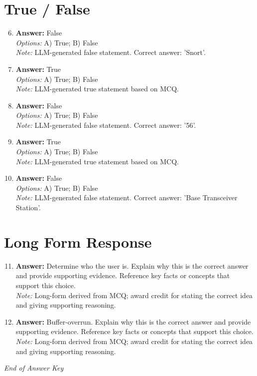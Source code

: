 \documentclass[12pt]{article}
\begin{document}
\section*{True / False}
\begin{enumerate}[label=\arabic*.]
\setcounter{enumi}{5}
\item \textbf{Answer:} False
\\ \textit{Options:} A) True; B) False
\\ \textit{Note:} LLM-generated false statement. Correct answer: 'Snort'.
\item \textbf{Answer:} True
\\ \textit{Options:} A) True; B) False
\\ \textit{Note:} LLM-generated true statement based on MCQ.
\item \textbf{Answer:} False
\\ \textit{Options:} A) True; B) False
\\ \textit{Note:} LLM-generated false statement. Correct answer: '56'.
\item \textbf{Answer:} True
\\ \textit{Options:} A) True; B) False
\\ \textit{Note:} LLM-generated true statement based on MCQ.
\item \textbf{Answer:} False
\\ \textit{Options:} A) True; B) False
\\ \textit{Note:} LLM-generated false statement. Correct answer: 'Base Transceiver Station'.
\end{enumerate}

\section*{Long Form Response}
\begin{enumerate}[label=\arabic*.]
\setcounter{enumi}{10}
\item \textbf{Answer:} Determine who the user is. Explain why this is the correct answer and provide supporting evidence. Reference key facts or concepts that support this choice.
\\ \textit{Note:} Long-form derived from MCQ; award credit for stating the correct idea and giving supporting reasoning.
\item \textbf{Answer:} Buffer-overrun. Explain why this is the correct answer and provide supporting evidence. Reference key facts or concepts that support this choice.
\\ \textit{Note:} Long-form derived from MCQ; award credit for stating the correct idea and giving supporting reasoning.
\end{enumerate}

\vfill
\noindent\textit{End of Answer Key}
\end{document}
